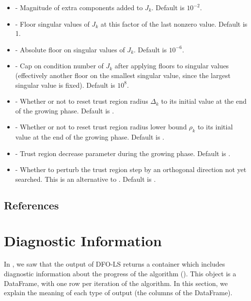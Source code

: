 \documentclass[letterpaper,10pt,english]{sphinxmanual}
\begin{document}
\begin{itemize}
\item {} 
 - Magnitude of extra components added to \(J_k\). Default is \(10^{-2}\).

\item {} 
 - Floor singular values of \(J_k\) at this factor of the last nonzero value. Default is 1.

\item {} 
 - Absolute floor on singular values of \(J_k\). Default is \(10^{-6}\).

\item {} 
 - Cap on condition number of \(J_k\) after applying floors to singular values (effectively another floor on the smallest singular value, since the largest singular value is fixed). Default is \(10^8\).

\item {} 
 - Whether or not to reset trust region radius \(\Delta_k\) to its initial value at the end of the growing phase. Default is .

\item {} 
 - Whether or not to reset trust region radius lower bound \(\rho_k\) to its initial value at the end of the growing phase. Default is .

\item {} 
 - Trust region decrease parameter during the growing phase. Default is .

\item {} 
 - Whether to perturb the trust region step by an orthogonal direction not yet searched. This is an alternative to . Default is .

\end{itemize}


\section{References}
\label{\detokenize{advanced:references}}

\chapter{Diagnostic Information}
\label{\detokenize{diagnostic:diagnostic-information}}\label{\detokenize{diagnostic::doc}}
In {\hyperref[\detokenize{userguide::doc}]{}}, we saw that the output of DFO-LS returns a container which includes diagnostic information about the progress of the algorithm (). This object is a  DataFrame, with one row per iteration of the algorithm. In this section, we explain the meaning of each type of output (the columns of the DataFrame).
\end{document}
